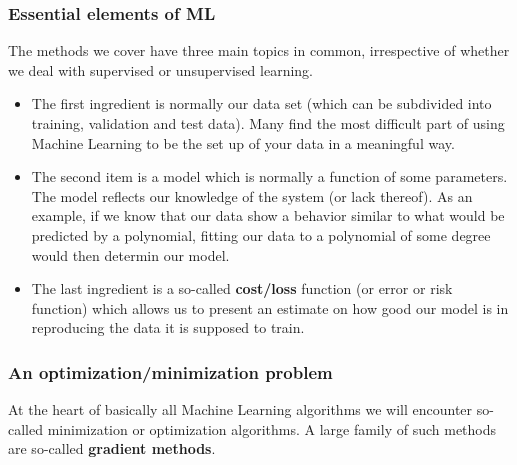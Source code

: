 \documentclass{beamer}
\begin{document}
\begin{frame}
\frametitle{Essential elements of ML}

The methods we cover have three main topics in common, irrespective of
whether we deal with supervised or unsupervised learning.
\begin{itemize}
\pause
\item The first ingredient is normally our data set (which can be subdivided into training, validation  and test data). Many find the most difficult part of using Machine Learning to be the set up of your data in a meaningful way. 

\pause
\item The second item is a model which is normally a function of some parameters.  The model reflects our knowledge of the system (or lack thereof). As an example, if we know that our data show a behavior similar to what would be predicted by a polynomial, fitting our data to a polynomial of some degree would then determin our model. 

\pause
\item The last ingredient is a so-called \textbf{cost/loss} function (or error or risk function) which allows us to present an estimate on how good our model is in reproducing the data it is supposed to train.  
\end{itemize}

\noindent
\end{frame}

\begin{frame}
\frametitle{An optimization/minimization problem}

At the heart of basically all Machine Learning algorithms we will encounter so-called minimization or optimization algorithms. A large family of such methods are so-called \textbf{gradient methods}.
\end{frame}
\end{document}
